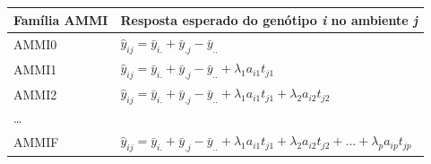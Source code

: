 \documentclass[
]{book}
\begin{document}
\begin{longtable}[]{@{}ll@{}}
\toprule
\begin{minipage}[b]{0.17\columnwidth}\raggedright
Família AMMI\strut
\end{minipage} & \begin{minipage}[b]{0.77\columnwidth}\raggedright
Resposta esperado do genótipo \emph{i} no ambiente \emph{j}\strut
\end{minipage}\tabularnewline
\midrule
\endhead
\begin{minipage}[t]{0.17\columnwidth}\raggedright
AMMI0\strut
\end{minipage} & \begin{minipage}[t]{0.77\columnwidth}\raggedright
\(\hat{y}_{ij} = \bar{y}_{i.} + \bar{y}_{.j} - \bar{y}_{..}\)\strut
\end{minipage}\tabularnewline
\begin{minipage}[t]{0.17\columnwidth}\raggedright
AMMI1\strut
\end{minipage} & \begin{minipage}[t]{0.77\columnwidth}\raggedright
\(\hat{y}_{ij} = \bar{y}_{i.} + \bar{y}_{.j} - \bar{y}_{..} +\lambda_1 a_{i1}t_{j1}\)\strut
\end{minipage}\tabularnewline
\begin{minipage}[t]{0.17\columnwidth}\raggedright
AMMI2\strut
\end{minipage} & \begin{minipage}[t]{0.77\columnwidth}\raggedright
\(\hat{y}_{ij} = \bar{y}_{i.} + \bar{y}_{.j} - \bar{y}_{..} +\lambda_1 a_{i1}t_{j1}+\lambda_2 a_{i2}t_{j2}\)\strut
\end{minipage}\tabularnewline
\begin{minipage}[t]{0.17\columnwidth}\raggedright
\ldots{}\strut
\end{minipage} & \begin{minipage}[t]{0.77\columnwidth}\raggedright
\strut
\end{minipage}\tabularnewline
\begin{minipage}[t]{0.17\columnwidth}\raggedright
AMMIF\strut
\end{minipage} & \begin{minipage}[t]{0.77\columnwidth}\raggedright
\(\hat{y}_{ij} = \bar{y}_{i.} + \bar{y}_{.j} - \bar{y}_{..} +\lambda_1 a_{i1}t_{j1}+\lambda_2 a_{i2}t_{j2}+...+\lambda_p a_{ip}t_{jp}\)\strut
\end{minipage}\tabularnewline
\bottomrule
\end{longtable}
\end{document}
